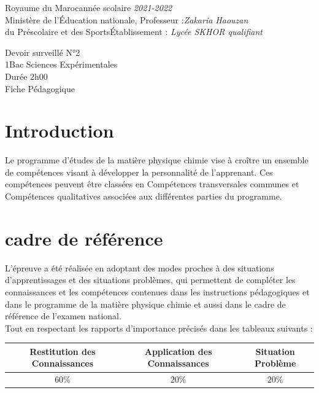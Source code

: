\documentclass[12pt]{article}
\newcommand\headerMe[2]{\noindent{}#1\hfill#2}
\begin{document}
\headerMe{Royaume du Maroc}{année scolaire \emph{2021-2022}}\\
\headerMe{Ministère de l'Éducation nationale, }{  Professeur :\emph{Zakaria Haouzan}}\\
\headerMe{du Préscolaire et des Sports}{Établissement : \emph{Lycée SKHOR qualifiant}}\\

\begin{center}
Devoir surveillé N°2 \\
1Bac Sciences Expérimentales\\
Durée 2h00
\\
    \vspace{.2cm}
\hrulefill
\Large{Fiche Pédagogique}
\hrulefill\\
\end{center}


\section[A]{Introduction }
\hspace{0.5cm}Le programme d'études de la matière physique chimie vise à croître un ensemble de compétences visant à développer la personnalité de l'apprenant. Ces compétences peuvent être classées en Compétences transversales communes et Compétences qualitatives associées aux différentes parties du programme.
\section{cadre de référence }
 \hspace{0.5cm}L'épreuve a été réalisée en adoptant des modes proches à des situations d'apprentissages et des situations problèmes, qui permettent de compléter les connaissances et les compétences contenues dans les instructions pédagogiques et dans le programme de la matière physique chimie et aussi dans le cadre de référence de l'examen national. 
 \\Tout en respectant les rapports d'importance précisés dans les tableaux suivants :
 \begin{center}
\begin{tabular}{|c||c||c|}
\hline
    \textbf{Restitution des Connaissances} & \textbf{Application des Connaissances} & \textbf{Situation Problème }\\
    \hline
    $60\%$ & $20\%$ & $20\%$\\
    \hline
\end{tabular} 
\end{center}
\end{document}

